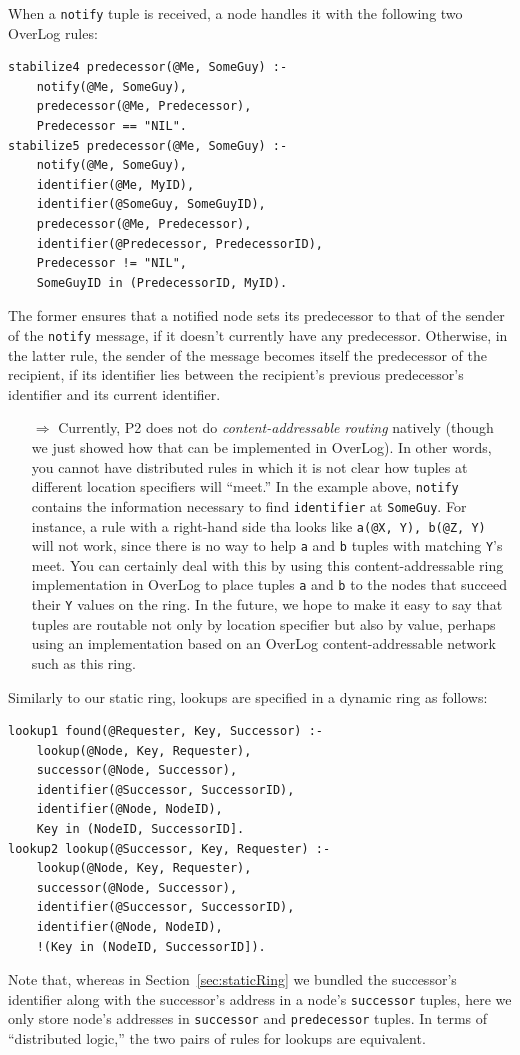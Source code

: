 \documentclass{article}
\begin{document}
When a \lstinline$notify$ tuple is received, a node handles it with the
following two OverLog rules:
\begin{lstlisting}
stabilize4 predecessor(@Me, SomeGuy) :-
	notify(@Me, SomeGuy),
	predecessor(@Me, Predecessor),
	Predecessor == "NIL".
stabilize5 predecessor(@Me, SomeGuy) :-
	notify(@Me, SomeGuy),
	identifier(@Me, MyID),
	identifier(@SomeGuy, SomeGuyID),
	predecessor(@Me, Predecessor),
	identifier(@Predecessor, PredecessorID),
	Predecessor != "NIL",
	SomeGuyID in (PredecessorID, MyID).
\end{lstlisting}
The former ensures that a notified node sets its predecessor to that of
the sender of the \lstinline$notify$ message, if it doesn't currently
have any predecessor. Otherwise, in the latter rule, the sender of the
message becomes itself the predecessor of the recipient, if its
identifier lies between the recipient's previous predecessor's identifier and its
current identifier.

\begin{itemize}
\item[$\Longrightarrow$] Currently, P2 does not do
  \emph{content-addressable routing} natively (though we just showed 
  how that can be implemented in OverLog). In other words, you cannot have
  distributed rules in which it is not clear how tuples at different
  location specifiers will ``meet.''  In the example above,
  \lstinline$notify$ contains the information necessary to find
  \lstinline$identifier$ at \lstinline$SomeGuy$.  For instance, a rule
  with a right-hand side tha looks like \lstinline$a(@X, Y), b(@Z, Y)$
  will not work, since there is no way to help \lstinline$a$ and
  \lstinline$b$ tuples with matching \lstinline$Y$'s meet.  You can
  certainly deal with this by using this content-addressable ring
  implementation in OverLog to place tuples \lstinline$a$ and
  \lstinline$b$ to the nodes that succeed their \lstinline$Y$ values on
  the ring.  In the future,  we hope to make it
  easy to say that tuples are routable not only by location specifier
  but also by value, perhaps using an implementation based on an OverLog
  content-addressable network such as this ring.
\end{itemize}


Similarly to our static ring, lookups are specified in a dynamic ring as
follows:
\begin{lstlisting}
lookup1 found(@Requester, Key, Successor) :-
	lookup(@Node, Key, Requester),
	successor(@Node, Successor),
	identifier(@Successor, SuccessorID),
	identifier(@Node, NodeID),
	Key in (NodeID, SuccessorID].
lookup2 lookup(@Successor, Key, Requester) :-
	lookup(@Node, Key, Requester),
	successor(@Node, Successor),
	identifier(@Successor, SuccessorID),
	identifier(@Node, NodeID),
	!(Key in (NodeID, SuccessorID]).
\end{lstlisting}
Note that, whereas in Section~\ref{sec:staticRing} we bundled the
successor's identifier along with the successor's address in a node's
\lstinline$successor$ tuples, here we only store node's addresses in
\lstinline$successor$ and \lstinline$predecessor$ tuples. In terms of
``distributed logic,'' the two pairs of rules for lookups are equivalent.
\end{document}
